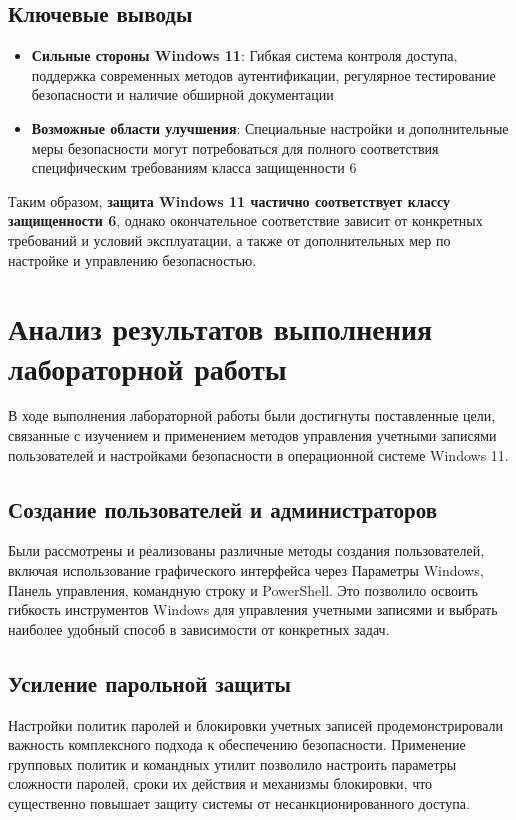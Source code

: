 \documentclass[a4paper, 14pt]{report}
\begin{document}
\subsection{Ключевые выводы}

\begin{itemize}
    \item \textbf{Сильные стороны Windows 11}: Гибкая система контроля доступа, поддержка современных методов аутентификации, регулярное тестирование безопасности и наличие обширной документации
    \item \textbf{Возможные области улучшения}: Специальные настройки и дополнительные меры безопасности могут потребоваться для полного соответствия специфическим требованиям класса защищенности 6
\end{itemize}

Таким образом, \textbf{защита Windows 11 частично соответствует классу защищенности 6}, однако окончательное соответствие зависит от конкретных требований и условий эксплуатации, а также от дополнительных мер по настройке и управлению безопасностью.
\section{Анализ результатов выполнения лабораторной работы}

В ходе выполнения лабораторной работы были достигнуты поставленные цели, связанные с изучением и применением методов управления учетными записями пользователей и настройками безопасности в операционной системе Windows 11.

\subsection{Создание пользователей и администраторов}
Были рассмотрены и реализованы различные методы создания пользователей, включая использование графического интерфейса через Параметры Windows, Панель управления, командную строку и PowerShell. Это позволило освоить гибкость инструментов Windows для управления учетными записями и выбрать наиболее удобный способ в зависимости от конкретных задач.

\subsection{Усиление парольной защиты}
Настройки политик паролей и блокировки учетных записей продемонстрировали важность комплексного подхода к обеспечению безопасности. Применение групповых политик и командных утилит позволило настроить параметры сложности паролей, сроки их действия и механизмы блокировки, что существенно повышает защиту системы от несанкционированного доступа.
\end{document}
